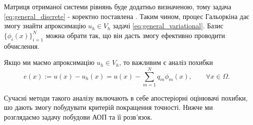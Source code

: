 Матриця отриманої системи рівнянь буде додатньо визначеною, тому задача \eqref{eq:general_discrete} - коректно поставлена \cite{OstShynAee11}.
Таким чином, процес Гальоркіна дає змогу знайти апроксимацію $u_h \in V_h$ задачі \eqref{eq:general_variational}.
Базис $\lbrace \phi_i(x)\rbrace_{i=1}^N$ можна обрати так, що він дасть змогу ефективно проводити обчислення.


Якщо ми маємо апроксимацію $u_h \in V_h$, то важливим є аналіз похибки
%
\begin{equation}
	e(x) := u(x) - u_h(x) = u(x) - \sum\limits_{m=1}^N q_m \phi_m (x), \qquad \forall x \in \Omega.
\end{equation}

Сучасні методи такого аналізу включають в себе апостеріорні оцінювачі похибки, шо дають змогу побудувати критерій покращення точності.
Нижче ми розглядаємо задачу побудови АОП та її розв'язок.
